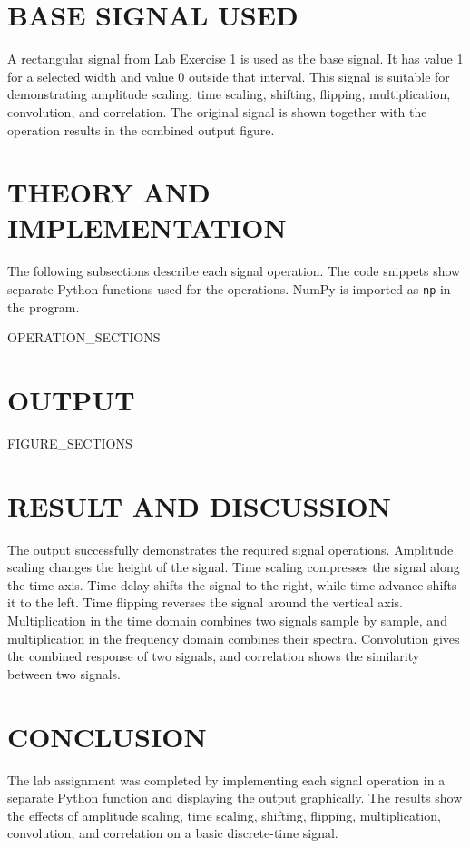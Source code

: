 \documentclass[12pt,a4paper]{article}
\begin{document}
\section*{BASE SIGNAL USED}

A rectangular signal from Lab Exercise 1 is used as the base signal. It has value 1 for a selected width and value 0 outside that interval. This signal is suitable for demonstrating amplitude scaling, time scaling, shifting, flipping, multiplication, convolution, and correlation. The original signal is shown together with the operation results in the combined output figure.

\section*{THEORY AND IMPLEMENTATION}

The following subsections describe each signal operation. The code snippets show separate Python functions used for the operations. NumPy is imported as \texttt{np} in the program.

{{OPERATION_SECTIONS}}

\section*{OUTPUT}

{{FIGURE_SECTIONS}}

\section*{RESULT AND DISCUSSION}

The output successfully demonstrates the required signal operations. Amplitude scaling changes the height of the signal. Time scaling compresses the signal along the time axis. Time delay shifts the signal to the right, while time advance shifts it to the left. Time flipping reverses the signal around the vertical axis. Multiplication in the time domain combines two signals sample by sample, and multiplication in the frequency domain combines their spectra. Convolution gives the combined response of two signals, and correlation shows the similarity between two signals.

\section*{CONCLUSION}

The lab assignment was completed by implementing each signal operation in a separate Python function and displaying the output graphically. The results show the effects of amplitude scaling, time scaling, shifting, flipping, multiplication, convolution, and correlation on a basic discrete-time signal.
\end{document}
